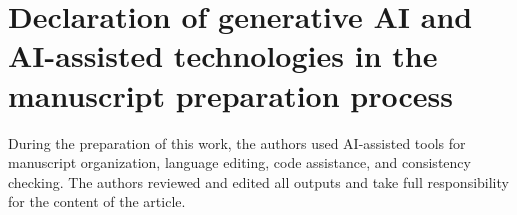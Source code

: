 \documentclass[preprint,12pt]{elsarticle}
\begin{document}
\section*{Declaration of generative AI and AI-assisted technologies in the manuscript preparation process}

During the preparation of this work, the authors used AI-assisted tools for manuscript organization, language editing, code assistance, and consistency checking. The authors reviewed and edited all outputs and take full responsibility for the content of the article.


\begingroup
\footnotesize

\endgroup
\end{document}

